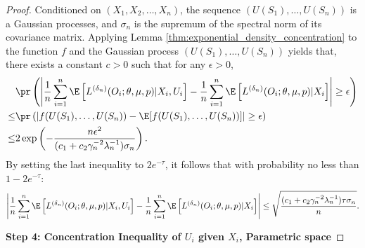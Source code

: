\begin{proof}
Conditioned on $(X_1,X_2,\ldots,X_n)$, the sequence $( U(S_1),\ldots, U(S_n))$ is a Gaussian processes, and $\sigma_n$ is the supremum of the spectral norm of its covariance matrix. Applying Lemma \ref{thm:exponential_density_concentration} to the function $f$ and the Gaussian process $( U(S_1),\ldots, U(S_n))$ yields that, there exists a constant $c>0$ such that for any $\epsilon>0$,
\begin{align*}
&\pr\left(\left|\frac{1}{n}\sum_{i=1}^n\E\left[L^{({\delta_n})}(O_i;\theta,\mu, p)|X_i,U_i\right]-\frac{1}{n}\sum_{i=1}^n\E\left[L^{({\delta_n})}(O_i;\theta,\mu, p)|X_i\right]\right|\geq \epsilon\right)\\
    \leq & \pr\left(\left|f( U(S_1),\ldots,U(S_n))-\E[f( U(S_1),\ldots,U(S_n))]\right|\geq \epsilon\right)\\
    \leq & 2 \exp\left(-\frac{n\epsilon^2}{(c_1 + c_2\gamma_n^{-2}\lambda_n^{-1})\sigma_n}\right).
\end{align*}
By setting the last inequality to $2e^{-\tau}$, it follows that with probability no less than $1-2e^{-\tau}$:
$$\left|\frac{1}{n}\sum_{i=1}^n\E\left[L^{({\delta_n})}(O_i;\theta,\mu, p)|X_i,U_i\right]-\frac{1}{n}\sum_{i=1}^n\E\left[L^{({\delta_n})}(O_i;\theta,\mu, p)|X_i\right]\right|\leq \sqrt{\frac{(c_1 + c_2\gamma_n^{-2}\lambda_n^{-1})\tau\sigma_n}{n}}.$$

\noindent \textbf{Step 4: Concentration Inequality of $ U_i$ given $X_i$, Parametric space}


\end{proof}
